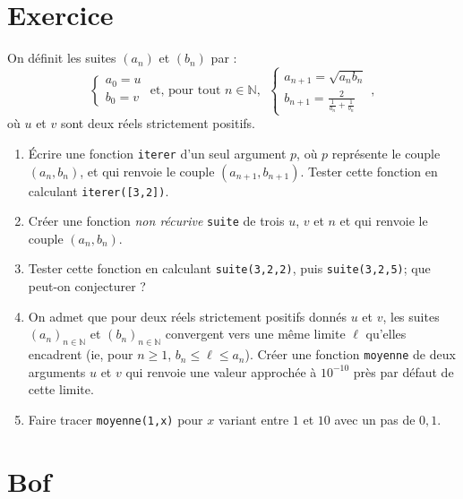\section*{Exercice}
On définit les suites $(a_n)$ et $(b_n)$
par :
$$\begin{cases}a_0=u\\ b_0=v\end{cases} \text{ et, pour tout }n\in \mathbb{N},~~ \begin{cases}a_{n+1}=\sqrt{a_nb_n}\\ 
b_{n+1}=\frac{2}{\frac{1}{a_n}+\frac{1}{b_n}}\end{cases},$$
où $u$ et $v$ sont deux réels strictement positifs.
\begin{enumerate}
\item Écrire une fonction \texttt{iterer}  d'un seul argument $p$, où $p$ représente le couple 
$(a_n,b_n)$, et qui renvoie le couple $(a_{n+1},b_{n+1})$. Tester cette fonction en calculant \texttt{iterer([3,2])}.
\item Créer une fonction \textit{non récurive} \texttt{suite} de trois $u$, $v$ et $n$ et qui renvoie 
le couple $(a_n,b_n)$.
\item Tester cette fonction en calculant \texttt{suite(3,2,2)}, puis \texttt{suite(3,2,5)}; que peut-on conjecturer ?
\item On admet que pour deux réels strictement positifs donnés $u$ et $v$, les suites $(a_n)_{n\in \mathbb{N}}$ et $(b_n)_{n\in \mathbb{N}}$ convergent vers une même limite $\ell$  qu'elles encadrent (ie, pour $n\geq  1$,  $b_n\leq  \ell \leq a_n$). Créer une fonction \texttt{moyenne}  de deux arguments $u$ et $v$ qui renvoie  une valeur approchée à $10^{-10}$ près par défaut de cette limite. 
\item Faire tracer \texttt{moyenne(1,x)} pour $x$ variant entre $1$ et $10$ avec un pas de $0,1$.
\end{enumerate}









\section{Bof}



